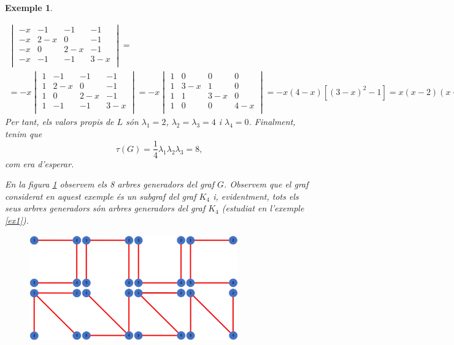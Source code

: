 \documentclass{article}
\newtheorem{example}{Exemple}[section]
\begin{document}
\begin{example}
\begin{enumerate}
\begin{multline*}
\begin{vmatrix}
        -x & -1 & -1 & -1\\
       -x & 2-x & 0 & -1\\
       -x & 0 & 2-x & -1\\
       -x & -1 & -1 & 3-x\\
    \end{vmatrix}=\\=-x\begin{vmatrix}
        1 & -1 & -1 & -1\\
        1 & 2-x & 0 & -1\\
        1 & 0 & 2-x & -1\\
        1 & -1 & -1 & 3-x\\
    \end{vmatrix}=-x\begin{vmatrix}
        1 & 0 & 0 & 0\\
        1 & 3-x & 1 & 0\\
        1 & 1 & 3-x & 0\\
        1 & 0 & 0 & 4-x\\
    \end{vmatrix}=-x(4-x)[(3-x)^2-1]=x(x-2)(x-4)^2.
            \end{multline*}
            Per tant, els valors propis de $L$ són $\lambda_1=2$, $\lambda_2=\lambda_3=4$ i $\lambda_4=0$. Finalment, tenim que $$\tau(G)=\frac{1}{4}\lambda_1\lambda_2\lambda_3=8,$$ com era d'esperar.
       \end{enumerate}
       En la figura \ref{graf1_8} observem els 8 arbres generadors del graf $G$. Observem que el graf considerat en aquest exemple és un subgraf del graf $K_4$ i, evidentment, tots els seus arbres generadors són arbres generadors del graf $K_4$ (estudiat en l'exemple \ref{ex1}).
       \begin{figure}[H]
           \centering
           \includegraphics[width=9cm]{imatges/graf1_8.jpg}
           \label{graf1_8}
       \end{figure}
    \end{example}
\end{document}
